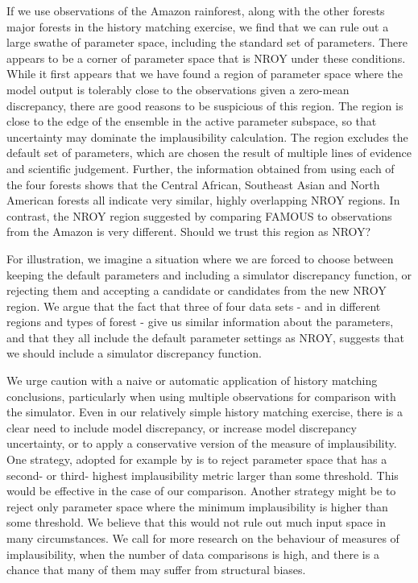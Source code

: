 \documentclass[esd, manuscript]{copernicus}
\begin{document}
If we use observations of the Amazon rainforest, along with the other forests major forests in the history matching exercise, we find that we can rule out a large swathe of parameter space, including the standard set of parameters. There appears to be a corner of parameter space that is NROY under these conditions. While it first appears that we have found a region of parameter space where the model output is tolerably close to the observations given a zero-mean discrepancy, there are good reasons to be suspicious of this region. The region is close to the edge of the ensemble in the active parameter subspace, so that uncertainty may dominate the implausibility calculation. The region excludes the default set of parameters, which are chosen the result of multiple lines of evidence and scientific judgement. Further, the information obtained from using each of the four forests shows that the Central African, Southeast Asian and North American forests all indicate very similar, highly overlapping NROY regions. In contrast, the NROY region suggested by comparing FAMOUS to observations from the Amazon is very different. Should we trust this region as NROY? 

For illustration, we imagine a situation where we are forced to choose between keeping the default parameters and including a simulator discrepancy function, or rejecting them and accepting a candidate or candidates from the new NROY region. We argue that the fact that three of four data sets - and in different regions and types of forest - give us similar information about the parameters, and that they all include the default parameter settings as NROY, suggests that we should include a simulator discrepancy function.

We urge caution with a naive or automatic application of history matching conclusions, particularly when using multiple observations for comparison with the simulator. Even in our relatively simple history matching exercise, there is a clear need to include model discrepancy, or increase model discrepancy uncertainty, or to apply a conservative version of the measure of implausibility. One strategy, adopted for example by \cite{vernon2014observable} is to reject parameter space that has a second- or third- highest implausibility metric larger than some threshold. This would be effective in the case of our comparison. Another strategy might be to reject only parameter space where the minimum implausibility is higher than some threshold. We believe that this would not rule out much input space in many circumstances. We call for more research on the behaviour of measures of implausibility, when the number of data comparisons is high, and there is a chance that many of them may suffer from structural biases. 
\end{document}
